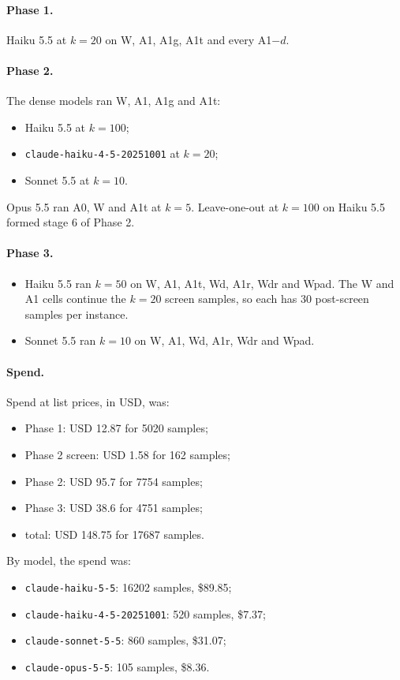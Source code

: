 \paragraph{Phase 1.} Haiku 5.5 at $k=20$ on W, A1, A1g, A1t and every A1$-d$.

\paragraph{Phase 2.} The dense models ran W, A1, A1g and A1t:
\begin{itemize}
\item Haiku 5.5 at $k=100$;
\item \texttt{claude-haiku-4-5-20251001} at $k=20$;
\item Sonnet 5.5 at $k=10$.
\end{itemize}
Opus 5.5 ran A0, W and A1t at $k=5$. Leave-one-out at $k=100$ on Haiku 5.5 formed stage 6 of Phase 2.

\paragraph{Phase 3.}
\begin{itemize}
\item Haiku 5.5 ran $k=50$ on W, A1, A1t, Wd, A1r, Wdr and Wpad. The W and A1 cells continue the $k=20$ screen samples, so each has 30 post-screen samples per instance.
\item Sonnet 5.5 ran $k=10$ on W, A1, Wd, A1r, Wdr and Wpad.
\end{itemize}

\paragraph{Spend.} Spend at list prices, in USD, was:
\begin{itemize}
\item Phase 1: USD 12.87 for 5020 samples;
\item Phase 2 screen: USD 1.58 for 162 samples;
\item Phase 2: USD 95.7 for 7754 samples;
\item Phase 3: USD 38.6 for 4751 samples;
\item total: USD 148.75 for 17687 samples.
\end{itemize}

By model, the spend was:
\begin{itemize}
\item \texttt{claude-haiku-5-5}: 16202 samples, \$89.85;
\item \texttt{claude-haiku-4-5-20251001}: 520 samples, \$7.37;
\item \texttt{claude-sonnet-5-5}: 860 samples, \$31.07;
\item \texttt{claude-opus-5-5}: 105 samples, \$8.36.
\end{itemize}

